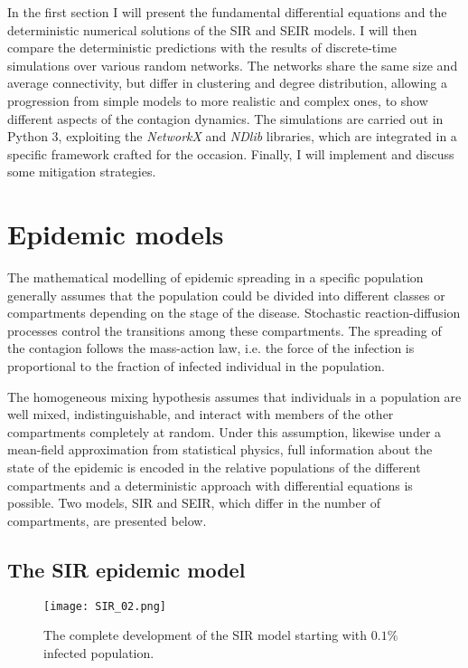 \documentclass[DIV=12, BCOR=0pt]{scrartcl}  %
\begin{document}
 	In the first section I will present the fundamental differential equations and the deterministic numerical solutions of the SIR and SEIR models. I will then compare the deterministic predictions with the results of discrete-time simulations over various random networks. The networks share the same size and average connectivity, but differ in clustering and degree distribution, allowing a progression from simple models to more realistic and complex ones, to show different aspects of the contagion dynamics. The simulations are carried out in Python 3, exploiting the \textit{NetworkX} and \textit{NDlib} libraries, which are integrated in a specific framework crafted for the occasion. %
 	Finally, I will implement and discuss some mitigation strategies.
  
  \section{Epidemic models}
  \label{sec:theory}
	The mathematical modelling of epidemic spreading in a specific population generally assumes that the population could be divided into different classes or compartments depending on the stage of the disease.
	Stochastic reaction-diffusion processes control the transitions among these compartments. 
	The spreading of the contagion follows the mass-action law, i.e. the force of the infection is proportional to the fraction of infected individual in the population.
	
  The homogeneous mixing hypothesis assumes that individuals in a population are well mixed, indistinguishable, and interact with members of the other compartments completely at random.
  Under this assumption, likewise under a mean-field approximation from statistical physics, full information about the state of the epidemic is encoded in the relative populations of the different compartments and a deterministic approach with differential equations is possible. Two models, SIR and SEIR, which differ in the number of compartments, are presented below.
   
  \subsection{The SIR epidemic model}
  
  \begin{figure}[h]
  	\centering
  	\texttt{[image: SIR\_02.png]}
  	\caption{The complete development of the SIR model starting with $0.1\%$ infected population.}
  	\label{fig:SIRtot}
  \end{figure}
\end{document}
